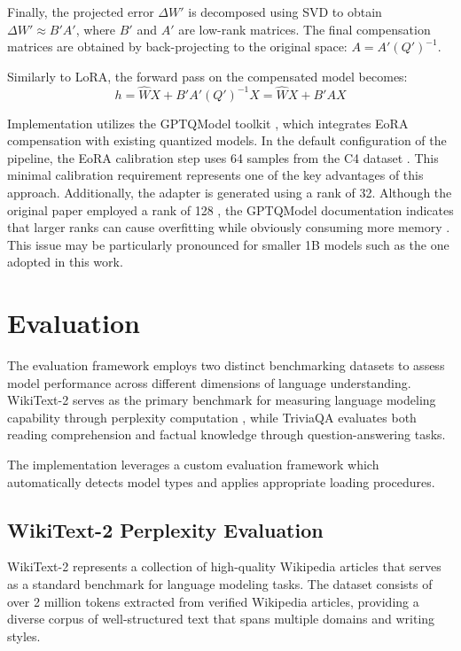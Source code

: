 Finally, the projected error $\Delta W'$ is decomposed using SVD to obtain $\Delta W' \approx B'A'$, where $B'$ and $A'$ are low-rank matrices. The final compensation matrices are obtained by back-projecting to the original space: $A = A'(Q')^{-1}$.

Similarly to LoRA, the forward pass on the compensated model becomes:
\begin{equation}
h = \hat{W}X + B'A'(Q')^{-1}X = \hat{W}X + B'AX
\end{equation}

Implementation utilizes the GPTQModel toolkit \cite{gptqmodel}, which integrates EoRA compensation with existing quantized models. In the default configuration of the pipeline, the EoRA calibration step uses 64 samples from the C4 dataset \cite{c4}. This minimal calibration requirement represents one of the key advantages of this approach. Additionally, the adapter is generated using a rank of 32. Although the original paper employed a rank of 128 \cite{eora}, the GPTQModel documentation indicates that larger ranks can cause overfitting while obviously consuming more memory \cite{gptqmodel}. This issue may be particularly pronounced for smaller 1B models such as the one adopted in this work.


\section{Evaluation} \label{evaluation}

The evaluation framework employs two distinct benchmarking datasets to assess model performance across different dimensions of language understanding. WikiText-2 \cite{wikitext} serves as the primary benchmark for measuring language modeling capability through perplexity computation \cite{perplexity}, while TriviaQA \cite{triviaqa} evaluates both reading comprehension and factual knowledge through question-answering tasks.

The implementation leverages a custom evaluation framework which automatically detects model types and applies appropriate loading procedures.

\subsection{WikiText-2 Perplexity Evaluation}

WikiText-2 \cite{wikitext} represents a collection of high-quality Wikipedia articles that serves as a standard benchmark for language modeling tasks. The dataset consists of over 2 million tokens extracted from verified Wikipedia articles, providing a diverse corpus of well-structured text that spans multiple domains and writing styles.

